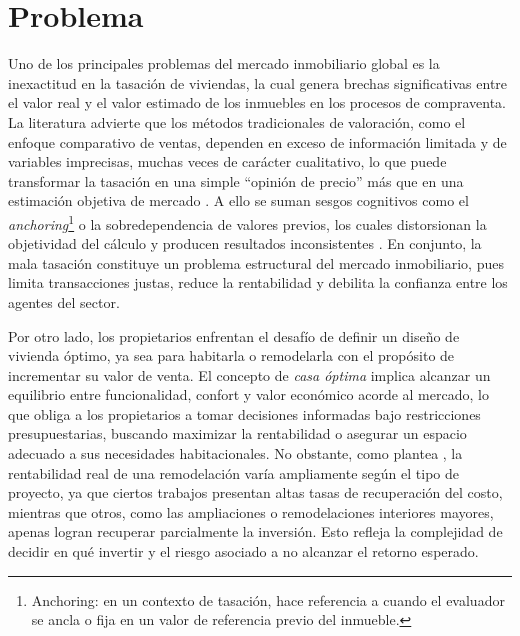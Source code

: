 \section{Problema \label{sec:sec1}}
Uno de los principales problemas del mercado inmobiliario global es la inexactitud en la tasación de viviendas, la cual genera brechas significativas entre el valor real y el valor estimado de los inmuebles en los procesos de compraventa. La literatura advierte que los métodos tradicionales de valoración, como el enfoque comparativo de ventas, dependen en exceso de información limitada y de variables imprecisas, muchas veces de carácter cualitativo, lo que puede transformar la tasación en una simple ``opinión de precio'' más que en una estimación objetiva de mercado \cite{appraisersblogs2015}. A ello se suman sesgos cognitivos como el \emph{anchoring}\footnote{Anchoring: en un contexto de tasación, hace referencia a cuando el evaluador se ancla o fija en un valor de referencia previo del inmueble.} o la sobredependencia de valores previos, los cuales distorsionan la objetividad del cálculo y producen resultados inconsistentes \cite{evans2019}. En conjunto, la mala tasación constituye un problema estructural del mercado inmobiliario, pues limita transacciones justas, reduce la rentabilidad y debilita la confianza entre los agentes del sector.

Por otro lado, los propietarios enfrentan el desafío de definir un diseño de vivienda óptimo, ya sea para habitarla o remodelarla con el propósito de incrementar su valor de venta. El concepto de \emph{casa óptima} implica alcanzar un equilibrio entre funcionalidad, confort y valor económico acorde al mercado, lo que obliga a los propietarios a tomar decisiones informadas bajo restricciones presupuestarias, buscando maximizar la rentabilidad o asegurar un espacio adecuado a sus necesidades habitacionales. No obstante, como plantea , la rentabilidad real de una remodelación varía ampliamente según el tipo de proyecto, ya que ciertos trabajos presentan altas tasas de recuperación del costo, mientras que otros, como las ampliaciones o remodelaciones interiores mayores, apenas logran recuperar parcialmente la inversión. Esto refleja la complejidad de decidir en qué invertir y el riesgo asociado a no alcanzar el retorno esperado.

